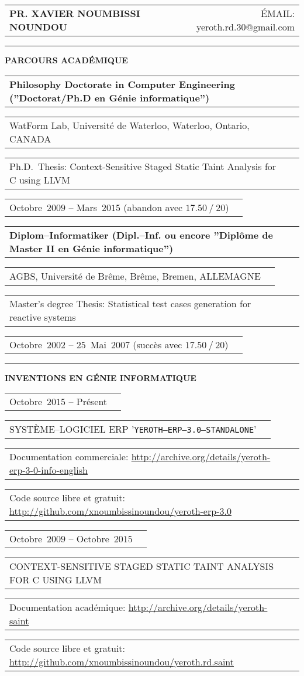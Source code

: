 \documentclass[9pt,a4paper]{article} %
\makeatletter
\newcommand{\headerrow}[2]
{\begin{tabular*}{\linewidth}{l@{\extracolsep{\fill}}r}
	#1 &
	#2 \\
\end{tabular*}}
\newcommand{\headerrowONE}[1]{\headerrow{#1}{}}
\newcommand{\cvitemdate}[2]{#1~$#2$\xspace}
\makeatother
\begin{document}
\bigskip


\headerrow
	{\Large \textbf{PR. XAVIER NOUMBISSI NOUNDOU}}	
	{\large ÉMAIL: yeroth.rd.30@gmail.com}

\vspace{1em}


\hrule
\begin{center}
{\large \textbf{PARCOURS ACADÉMIQUE}}
\end{center}

\vspace{0.5em}

\headerrowONE{\textbf{Philosophy Doctorate in Computer Engineering (''Doctorat/Ph.D en Génie informatique'')}}	
\headerrowONE{WatForm Lab, Université de Waterloo, Waterloo, Ontario, CANADA}
\headerrowONE{Ph.D.~Thesis: Context-Sensitive Staged Static Taint Analysis for C using LLVM}
\headerrowONE{\cvitemdate{Octobre}{2009} -- \cvitemdate{Mars}{2015} (abandon avec $17.50~/~20$)}	
	
\vspace{0.3em}
	
\headerrowONE{\textbf{Diplom--Informatiker (Dipl.--Inf. ou encore ''Diplôme de Master II en Génie informatique'')}}	
\headerrowONE{AGBS, Université de Brême, Brême, Bremen, ALLEMAGNE}
\headerrowONE{Master's degree Thesis: Statistical test cases generation for reactive systems}
\headerrowONE{\cvitemdate{Octobre}{2002} -- \cvitemdate{$25$~Mai}{2007} (succès avec $17.50~/~20$)}	

\vspace{1em}

\hrule
\begin{center}
{\large \textbf{INVENTIONS EN GÉNIE INFORMATIQUE}}
\end{center}

\vspace{0.5em}

\headerrowONE{\cvitemdate{Octobre}{2015} -- Présent}	
\headerrowONE{SYSTÈME--LOGICIEL ERP '\texttt{YEROTH--ERP--3.0--STANDALONE}'}	
\headerrowONE{Documentation commerciale: \url{http://archive.org/details/yeroth-erp-3-0-info-english}}
\headerrowONE{Code source libre et gratuit: \url{http://github.com/xnoumbissinoundou/yeroth-erp-3.0}}

\vspace{0.3em}
	
\headerrowONE{\cvitemdate{Octobre}{2009} -- \cvitemdate{Octobre}{2015}}	
\headerrowONE{CONTEXT-SENSITIVE STAGED STATIC TAINT ANALYSIS FOR C USING LLVM}
\headerrowONE{Documentation académique: \url{http://archive.org/details/yeroth-saint}}
\headerrowONE{Code source libre et gratuit: \url{http://github.com/xnoumbissinoundou/yeroth.rd.saint}}
	
\end{document}
